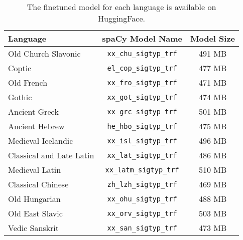 \documentclass{../acl_latex.tex}
\begin{document}
\begin{table*}[t]
    \centering
    \begin{tabular}{lcc}
        \toprule
        Language                 & spaCy Model Name               & Model Size \\ \midrule
        Old Church Slavonic      & \texttt{xx\_chu\_sigtyp\_trf}  & 491 MB     \\
        Coptic                   & \texttt{el\_cop\_sigtyp\_trf}  & 477 MB     \\
        Old French               & \texttt{xx\_fro\_sigtyp\_trf}  & 471 MB     \\
        Gothic                   & \texttt{xx\_got\_sigtyp\_trf}  & 474 MB     \\
        Ancient Greek            & \texttt{xx\_grc\_sigtyp\_trf}  & 501 MB     \\
        Ancient Hebrew           & \texttt{he\_hbo\_sigtyp\_trf}  & 475 MB     \\
        Medieval Icelandic       & \texttt{xx\_isl\_sigtyp\_trf}  & 496 MB     \\
        Classical and Late Latin & \texttt{xx\_lat\_sigtyp\_trf}  & 486 MB     \\
        Medieval Latin           & \texttt{xx\_latm\_sigtyp\_trf} & 510 MB     \\
        Classical Chinese        & \texttt{zh\_lzh\_sigtyp\_trf}  & 469 MB     \\
        Old Hungarian            & \texttt{xx\_ohu\_sigtyp\_trf}  & 488 MB     \\
        Old East Slavic          & \texttt{xx\_orv\_sigtyp\_trf}  & 503 MB     \\
        Vedic Sanskrit           & \texttt{xx\_san\_sigtyp\_trf}  & 473 MB     \\ \bottomrule
    \end{tabular}
    \caption{
        The finetuned model for each language is available on HuggingFace.
    }
    \label{table:model_table}
\end{table*}
\end{document}
